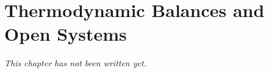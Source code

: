 \chapter{Thermodynamic Balances and Open Systems}\label{ch:b2:open-systems}


\emph{This chapter has not been written yet.}
